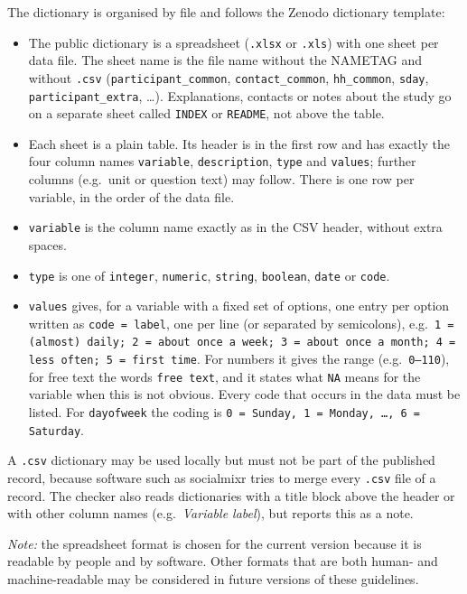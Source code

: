 \documentclass[11pt,a4paper]{article}
\begin{document}
\begin{enumerate}
    \noindent The dictionary is organised by file and follows the Zenodo dictionary template:
    \begin{itemize}
        \item The public dictionary is a spreadsheet (\texttt{.xlsx} or \texttt{.xls}) with one sheet per data file. The sheet name is the file name without the NAMETAG and without \texttt{.csv} (\texttt{participant\_common}, \texttt{contact\_common}, \texttt{hh\_common}, \texttt{sday}, \texttt{participant\_extra}, \ldots). Explanations, contacts or notes about the study go on a separate sheet called \texttt{INDEX} or \texttt{README}, not above the table.
        \item Each sheet is a plain table. Its header is in the first row and has exactly the four column names \texttt{variable}, \texttt{description}, \texttt{type} and \texttt{values}; further columns (e.g.\ unit or question text) may follow. There is one row per variable, in the order of the data file.
        \item \texttt{variable} is the column name exactly as in the CSV header, without extra spaces.
        \item \texttt{type} is one of \texttt{integer}, \texttt{numeric}, \texttt{string}, \texttt{boolean}, \texttt{date} or \texttt{code}.
        \item \texttt{values} gives, for a variable with a fixed set of options, one entry per option written as \texttt{code = label}, one per line (or separated by semicolons), e.g.\ \texttt{1 = (almost) daily; 2 = about once a week; 3 = about once a month; 4 = less often; 5 = first time}. For numbers it gives the range (e.g.\ \texttt{0--110}), for free text the words \texttt{free text}, and it states what \texttt{NA} means for the variable when this is not obvious. Every code that occurs in the data must be listed. For \texttt{dayofweek} the coding is \texttt{0 = Sunday, 1 = Monday, \ldots, 6 = Saturday}.
    \end{itemize}
    A \texttt{.csv} dictionary may be used locally but must not be part of the published record, because software such as socialmixr tries to merge every \texttt{.csv} file of a record. The checker also reads dictionaries with a title block above the header or with other column names (e.g.\ \textit{Variable label}), but reports this as a note.

    \noindent\textit{Note:} the spreadsheet format is chosen for the current version because it is readable by people and by software. Other formats that are both human- and machine-readable may be considered in future versions of these guidelines.


\end{enumerate}
\end{document}
